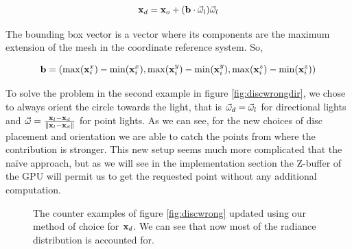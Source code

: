 $$
\mathbf{x}_d = \mathbf{x}_o + (\mathbf{b} \cdot \vec{\omega}_l) \vec{\omega}_l
$$

The bounding box vector is a vector where its components are the maximum extension of the mesh in the coordinate reference system. So,

$$
\mathbf{b} = (\max(\mathbf{x}_i^x) - \min(\mathbf{x}_i^x), \max(\mathbf{x}_i^y) - \min(\mathbf{x}_i^y), \max(\mathbf{x}_i^z) - \min(\mathbf{x}_i^z))
$$ 

To solve the problem in the second example in figure \ref{fig:discwrongdir}, we chose to always orient the circle towards the light, that is $\vec{\omega}_d = \vec{\omega}_l$ for directional lights and $\vec{\omega} = \frac{\mathbf{x}_l - \mathbf{x}_d}{\|\mathbf{x}_l - \mathbf{x}_d\|}$ for point lights. As we can see, for the new choices of disc placement and orientation we are able to catch the points from where the contribution is stronger. This new setup seems much more complicated that the na\"{i}ve approach, but as we will see in the implementation section the Z-buffer of the GPU will permit us to get the requested point without any additional computation.

\begin{figure}
\centering
{}
\label{fig:discright}
\caption{The counter examples of figure \ref{fig:discwrong} updated using our method of choice for $\mathbf{x}_d$. We can see that now most of the radiance distribution is accounted for.}
\end{figure}

